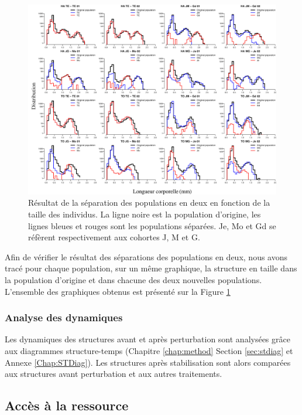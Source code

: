 \begin{figure}[!ht]
\begin{center}
\includegraphics[width=1\textwidth]{1_CorpsDeThese/Resumes/Fig/SM01}
\caption[Séparation des
populations]{Résultat de la séparation des populations en deux en fonction de
la taille des individus. La ligne noire est la population d'origine, les lignes
bleues et rouges sont les populations séparées. Je, Mo et Gd se réfèrent
respectivement aux cohortes J, M et G.}
\label{fig:SM1}
\end{center}
\end{figure}

Afin de vérifier le résultat des séparations des populations en deux, nous avons
tracé pour chaque population, sur un même graphique, la structure en
taille dans la population d'origine et dans chacune des deux nouvelles
populations. L'ensemble des graphiques obtenus est présenté sur la Figure
\ref{fig:SM1}

\subsubsection{Analyse des dynamiques}

Les dynamiques des structures avant et après perturbation sont analysées grâce
aux diagrammes structure-temps (Chapitre \ref{chap:method} Section \ref{sec:stdiag} et
Annexe \ref{Chap:STDiag}).
Les structures après stabilisation sont alors comparées aux structures avant perturbation et
aux autres traitements. 

\subsection{Accès à la ressource}

